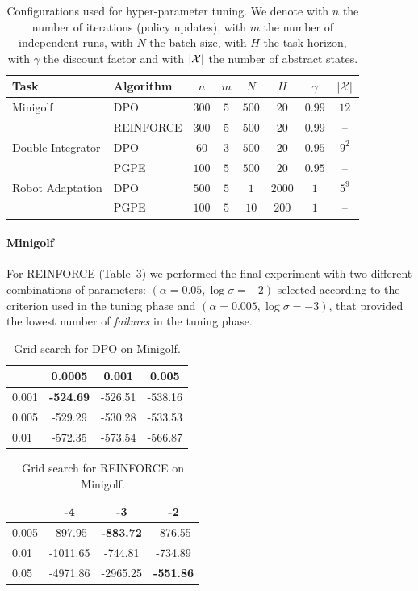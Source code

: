 \begin{table}
	\centering
	\begin{tabular}{ll|cccccc}
		\toprule
		\textbf{Task} & \textbf{Algorithm} & $n$ & $m$ & $N$ & $H$ & $\gamma$ & $|\mathcal{X}|$\\
		\midrule
		Minigolf & DPO & $300$ & $5$ & $500$ & 20 & $0.99$ & $12$ \\
		& REINFORCE & $300$ & $5$ & $500$ & 20 & $0.99$ & -- \\
		Double Integrator & DPO & $60$ & $3$ & $500$ & $20$ & $0.95$ & $9^{2}$ \\
		& PGPE & $100$ & $5$ & $500$ & $20$ & $0.95$ & -- \\
		Robot Adaptation & DPO & $500$ & $5$ & $1$ & $2000$ & $1$ & $5^{9}$ \\
		& PGPE & $100$ & $5$ & $10$ & $200$ & $1$ & --\\
		\midrule
	\end{tabular}
	\caption{\label{tab:recap1}Configurations used for hyper-parameter tuning. We denote with $n$ the number of iterations (policy updates), with $m$ the number of independent runs, with $N$ the batch size, with $H$ the task horizon, with $\gamma$ the discount factor and with $|\mathcal{X}|$ the number of abstract states.}
\end{table}

\paragraph{Minigolf}
For REINFORCE (Table~\ref{tab:t2}) we performed the final experiment with two different combinations of parameters: $(\alpha=0.05, \log\sigma=-2)$ selected according to the criterion used in the tuning phase and $(\alpha=0.005, \log\sigma=-3)$, that provided the lowest number of \emph{failures} in the tuning phase.
\begin{table}[H]
	\centering
	\begin{tabular}{l|*{3}{c}}
		\toprule
		\backslashbox{$\alpha$}{$\lambda$}
		&0.0005&0.001&0.005\\
		\midrule
		0.001 & \textbf{-524.69} & -526.51 & -538.16 \\
		0.005 & -529.29 & -530.28 & -533.53 \\
		0.01 & -572.35 & -573.54 & -566.87 \\
		\bottomrule
	\end{tabular} \caption{\label{tab:t1} Grid search for \ac{DPO} on Minigolf.}
\end{table}
\begin{table}[H]
	\centering
	\begin{tabular}{l|*{3}{c}}
		\toprule
		\backslashbox{$\alpha$}{$\log\sigma$}
		&-4&-3&-2\\
		\midrule
		0.005 & -897.95 & \textbf{-883.72} & -876.55 \\
		0.01 & -1011.65 & -744.81 & -734.89 \\
		0.05 & -4971.86 & -2965.25 & \textbf{-551.86} \\
		\bottomrule
	\end{tabular} \caption{\label{tab:t2}Grid search for REINFORCE on Minigolf.}
\end{table}


